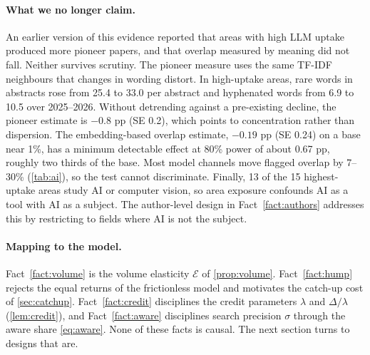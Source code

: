 \paragraph{What we no longer claim.} An earlier version of this evidence
reported that areas with high LLM uptake produced more pioneer papers, and
that overlap measured by meaning did not fall. Neither survives scrutiny. The
pioneer measure uses the same TF-IDF neighbours that changes in wording distort.
In high-uptake areas, rare words in abstracts rose from 25.4 to 33.0 per abstract
and hyphenated words from 6.9 to 10.5 over 2025--2026. Without detrending against
a pre-existing decline, the pioneer estimate is $-0.8$ pp (SE 0.2), which points to
concentration rather than dispersion. The embedding-based overlap estimate,
$-0.19$ pp (SE 0.24) on a base near 1\%, has a minimum detectable effect at 80\%
power of about 0.67 pp, roughly two thirds of the base. Most model channels move
flagged overlap by 7--30\% (\cref{tab:ai}), so the test cannot discriminate.
Finally, 13 of the 15 highest-uptake areas study AI or computer vision, so area
exposure confounds AI as a tool with AI as a subject. The author-level design in
Fact~\ref{fact:authors} addresses this by restricting to fields where AI is not
the subject.

\paragraph{Mapping to the model.} Fact~\ref{fact:volume} is the volume
elasticity $\mathcal E$ of \cref{prop:volume}. Fact~\ref{fact:hump} rejects the
equal returns of the frictionless model and motivates the catch-up cost of
\cref{sec:catchup}. Fact~\ref{fact:credit} disciplines the credit parameters
$\lambda$ and $\Delta/\lambda$ (\cref{lem:credit}), and Fact~\ref{fact:aware}
disciplines search precision $\sigma$ through the aware share \eqref{eq:aware}.
None of these facts is causal. The next section turns to designs that are.
